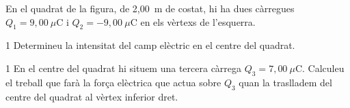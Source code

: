 \begin{minipage}[t]{0.74\linewidth}
En el quadrat de la figura, de 2,00~m de costat, hi ha dues càrregues $Q_1 = 9,00\ \mu\mathrm{C}$ i $Q_2 = -9,00\ \mu\mathrm{C}$ en els vèrtexs de l'esquerra.
\end{minipage}\hfill
\begin{minipage}[t]{0.2\linewidth}
\vspace{0pt}
\end{minipage}

\begin{apartat}{1}
Determineu la intensitat del camp elèctric en el centre del quadrat.
\end{apartat}

\begin{apartat}{1}
En el centre del quadrat hi situem una tercera càrrega $Q_3 = 7,00\ \mu\mathrm{C}$. Calculeu el treball que farà la força elèctrica que actua sobre $Q_3$ quan la traslladem del centre del quadrat al vèrtex inferior dret.
\end{apartat}

